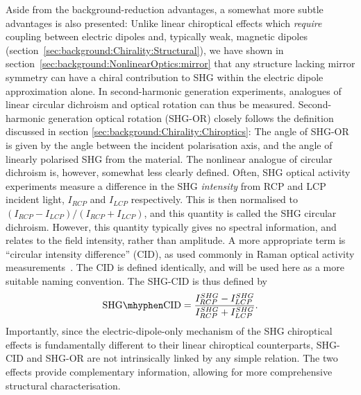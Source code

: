 Aside from the background-reduction advantages, a somewhat more subtle advantages is also presented: Unlike linear chiroptical effects which \textit{require} coupling between electric dipoles and, typically weak, magnetic dipoles (section~\ref{sec:background:Chirality:Structural}), we have shown in section~\ref{sec:background:NonlinearOptics:mirror} that any structure lacking mirror symmetry can have a chiral contribution to SHG within the electric dipole approximation alone. 
In second-harmonic generation experiments, analogues of linear circular dichroism and optical rotation can thus be measured. Second-harmonic generation optical rotation (SHG-OR) closely follows the definition discussed in section \ref{sec:background:Chirality:Chiroptics}: The angle of SHG-OR is given by the angle between the incident polarisation axis, and the angle of linearly polarised SHG from the material. The nonlinear analogue of circular dichroism is, however, somewhat less clearly defined. Often, SHG optical activity experiments measure a difference in the SHG \textit{intensity} from RCP and LCP incident light, $I_{RCP}$ and $I_{LCP}$ respectively. This is then normalised to $(I_{RCP} - I_{LCP})/(I_{RCP} + I_{LCP})$, and this quantity is called the SHG circular dichroism. However, this quantity typically gives no spectral information, and relates to the field intensity, rather than amplitude. A more appropriate term is ``circular intensity difference'' (CID), as used commonly in Raman optical activity measurements~\cite[\S 1.4]{Barron2004}. The CID is defined identically, and will be used here as a more suitable naming convention. The SHG-CID is thus defined by
\begin{equation}\label{eq:background:NonlinearOptics:CID}	
	\mathrm{SHG \mhyphen CID} = \frac{I_{RCP}^{SHG} - I_{LCP}^{SHG}}{I_{RCP}^{SHG} + I_{LCP}^{SHG}}.
\end{equation}
Importantly, since the electric-dipole-only mechanism of the SHG chiroptical effects is fundamentally different to their linear chiroptical counterparts, SHG-CID and SHG-OR are not intrinsically linked by any simple relation. The two effects provide complementary information, allowing for more comprehensive structural characterisation.

